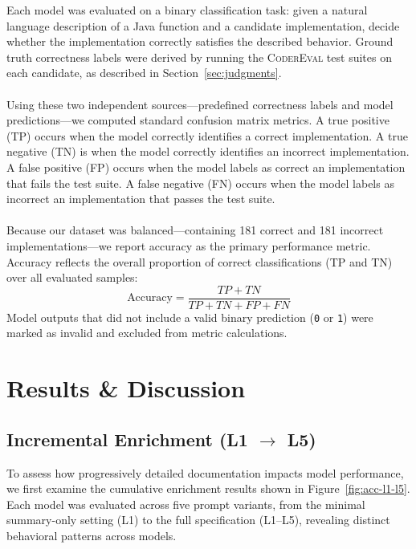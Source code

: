 \documentclass[a4paper]{usiinfbachelorproject}
\begin{document}
Each model was evaluated on a binary classification task: given a natural language description of a Java function and a candidate implementation, decide whether the implementation correctly satisfies the described behavior. Ground truth correctness labels were derived by running the \textsc{CoderEval} test suites on each candidate, as described in Section~\ref{sec:judgments}. \\
\\
Using these two independent sources—predefined correctness labels and model predictions—we computed standard confusion matrix metrics. A true positive (TP) occurs when the model correctly identifies a correct implementation. A true negative (TN) is when the model correctly identifies an incorrect implementation. A false positive (FP) occurs when the model labels as correct an implementation that fails the test suite. A false negative (FN) occurs when the model labels as incorrect an implementation that passes the test suite.\\
\\[2pt]
Because our dataset was balanced—containing 181 correct and 181 incorrect implementations—we report accuracy as the primary performance metric. Accuracy reflects the overall proportion of correct classifications (TP and TN) over all evaluated samples:
\[
\text{Accuracy} = \frac{TP + TN}{TP + TN + FP + FN}
\]
Model outputs that did not include a valid binary prediction (\texttt{0} or \texttt{1}) were marked as invalid and excluded from metric calculations.

\section{Results \& Discussion}\label{sec:results}

\subsection{Incremental Enrichment (L1 $\rightarrow$ L5)}

To assess how progressively detailed documentation impacts model performance, we first examine the cumulative enrichment results shown in Figure~\ref{fig:acc-l1-l5}. Each model was evaluated across five prompt variants, from the minimal summary-only setting (L1) to the full specification (L1–L5), revealing distinct behavioral patterns across models.
\end{document}
